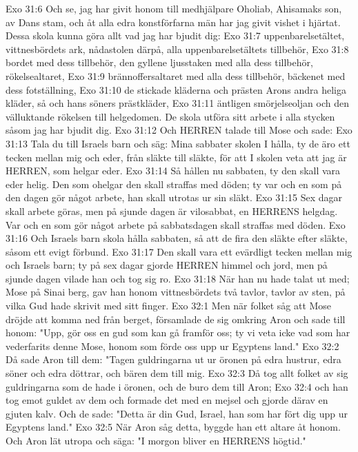 Exo 31:6  Och se, jag har givit honom till medhjälpare Oholiab, Ahisamaks son, av Dans stam, och åt alla edra konstförfarna män har jag givit vishet i hjärtat. Dessa skola kunna göra allt vad jag har bjudit dig:
Exo 31:7  uppenbarelsetältet, vittnesbördets ark, nådastolen därpå, alla uppenbarelsetältets tillbehör,
Exo 31:8  bordet med dess tillbehör, den gyllene ljusstaken med alla dess tillbehör, rökelsealtaret,
Exo 31:9  brännoffersaltaret med alla dess tillbehör, bäckenet med dess fotställning,
Exo 31:10  de stickade kläderna och prästen Arons andra heliga kläder, så och hans söners prästkläder,
Exo 31:11  äntligen smörjelseoljan och den välluktande rökelsen till helgedomen. De skola utföra sitt arbete i alla stycken såsom jag har bjudit dig.
Exo 31:12  Och HERREN talade till Mose och sade:
Exo 31:13  Tala du till Israels barn och säg: Mina sabbater skolen I hålla, ty de äro ett tecken mellan mig och eder, från släkte till släkte, för att I skolen veta att jag är HERREN, som helgar eder.
Exo 31:14  Så hållen nu sabbaten, ty den skall vara eder helig. Den som ohelgar den skall straffas med döden; ty var och en som på den dagen gör något arbete, han skall utrotas ur sin släkt.
Exo 31:15  Sex dagar skall arbete göras, men på sjunde dagen är vilosabbat, en HERRENS helgdag. Var och en som gör något arbete på sabbatsdagen skall straffas med döden.
Exo 31:16  Och Israels barn skola hålla sabbaten, så att de fira den släkte efter släkte, såsom ett evigt förbund.
Exo 31:17  Den skall vara ett evärdligt tecken mellan mig och Israels barn; ty på sex dagar gjorde HERREN himmel och jord, men på sjunde dagen vilade han och tog sig ro.
Exo 31:18  När han nu hade talat ut med; Mose på Sinai berg, gav han honom vittnesbördets två tavlor, tavlor av sten, på vilka Gud hade skrivit med sitt finger.
Exo 32:1  Men när folket såg att Mose dröjde att komma ned från berget, församlade de sig omkring Aron och sade till honom: "Upp, gör oss en gud som kan gå framför oss; ty vi veta icke vad som har vederfarits denne Mose, honom som förde oss upp ur Egyptens land."
Exo 32:2  Då sade Aron till dem: "Tagen guldringarna ut ur öronen på edra hustrur, edra söner och edra döttrar, och bären dem till mig.
Exo 32:3  Då tog allt folket av sig guldringarna som de hade i öronen, och de buro dem till Aron;
Exo 32:4  och han tog emot guldet av dem och formade det med en mejsel och gjorde därav en gjuten kalv. Och de sade: "Detta är din Gud, Israel, han som har fört dig upp ur Egyptens land."
Exo 32:5  När Aron såg detta, byggde han ett altare åt honom. Och Aron lät utropa och säga: "I morgon bliver en HERRENS högtid."
